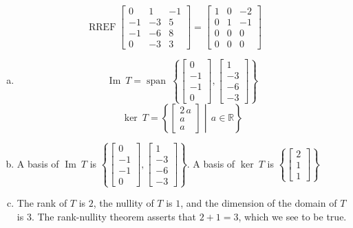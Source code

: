 \begin{exerciseAnswer} 


\[\operatorname{RREF} \left[\begin{array}{ccc}
0 & 1 & -1 \\
-1 & -3 & 5 \\
-1 & -6 & 8 \\
0 & -3 & 3
\end{array}\right] = \left[\begin{array}{ccc}
1 & 0 & -2 \\
0 & 1 & -1 \\
0 & 0 & 0 \\
0 & 0 & 0
\end{array}\right] \]


\begin{enumerate}[(a)]
\item \[\operatorname{Im}\ T = \operatorname{span}\  \left\{ \left[\begin{array}{c}
0 \\
-1 \\
-1 \\
0
\end{array}\right] , \left[\begin{array}{c}
1 \\
-3 \\
-6 \\
-3
\end{array}\right] \right\} \]\[\operatorname{ker}\ T =  \left\{ \left[\begin{array}{c}
2 \, a \\
a \\
a
\end{array}\right] \middle|\,a\in\mathbb{R}\right\} \]
\item  A basis of \(\operatorname{Im}\ T\) is \( \left\{ \left[\begin{array}{c}
0 \\
-1 \\
-1 \\
0
\end{array}\right] , \left[\begin{array}{c}
1 \\
-3 \\
-6 \\
-3
\end{array}\right] \right\} \). A basis of \(\operatorname{ker}\ T\) is \( \left\{ \left[\begin{array}{c}
2 \\
1 \\
1
\end{array}\right] \right\} \)
\item  The rank of \(T\) is \( 2 \), the nullity of \(T\) is \( 1 \), and the dimension of the domain of \(T\) is \( 3 \). The rank-nullity theorem asserts that \( 2 + 1 = 3 \), which we see to be true. 
\end{enumerate}
    
\end{exerciseAnswer}
    
